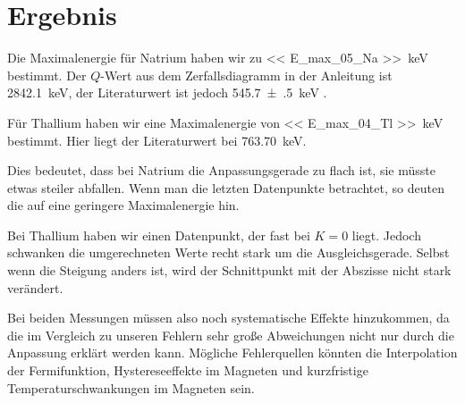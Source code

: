 \documentclass[11pt, ngerman, fleqn, DIV=15, headinclude, BCOR=2cm]{scrreprt}
\begin{document}
\chapter{Ergebnis}

Die Maximalenergie für Natrium haben wir zu \SI{<< E_max_05_Na
>>}{\kilo\electronvolt} bestimmt. Der $Q$-Wert aus dem Zerfallsdiagramm in
der Anleitung ist \SI{2842.1}{\kilo\electronvolt}, der Literaturwert ist jedoch
\SI{545.7(5)}{\kilo\electronvolt} \parencite{Beck/Positronenspektrum}.

Für Thallium haben wir eine Maximalenergie von \SI{<< E_max_04_Tl
>>}{\kilo\electronvolt} bestimmt. Hier liegt der Literaturwert bei
\SI{763.70}{\kilo\electronvolt}.

Dies bedeutet, dass bei Natrium die Anpassungsgerade zu flach ist, sie müsste
etwas steiler abfallen. Wenn man die letzten Datenpunkte betrachtet, so deuten
die auf eine geringere Maximalenergie hin.

Bei Thallium haben wir einen Datenpunkt, der fast bei $K = 0$ liegt. Jedoch
schwanken die umgerechneten Werte recht stark um die Ausgleichsgerade. Selbst
wenn die Steigung anders ist, wird der Schnittpunkt mit der Abszisse nicht
stark verändert.

Bei beiden Messungen müssen also noch systematische Effekte hinzukommen, da die
im Vergleich zu unseren Fehlern sehr große Abweichungen nicht nur durch die
Anpassung erklärt werden kann. Mögliche Fehlerquellen könnten die Interpolation
der Fermifunktion, Hystereseeffekte im Magneten und kurzfristige
Temperaturschwankungen im Magneten sein.

\IfFileExists{\bibliographyfile}{
    \printbibliography
}{}
\end{document}
